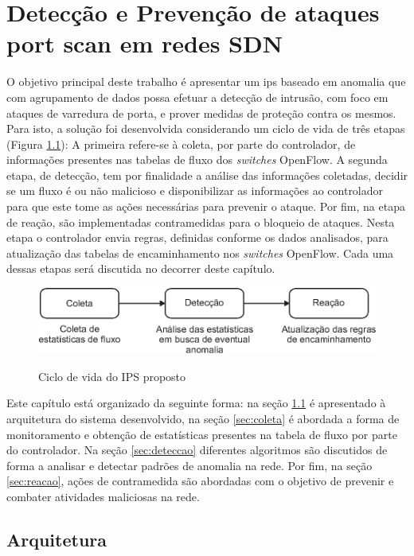 \chapter{Detecção e Prevenção de ataques port scan em redes SDN}
\label{cap:metodologia}

O objetivo principal deste trabalho é apresentar um \gls{ips} baseado em anomalia que com agrupamento de dados possa efetuar a detecção de intrusão, com foco em ataques de varredura de porta, e prover medidas de proteção contra os mesmos. Para isto, a solução foi desenvolvida considerando um ciclo de vida de três etapas (Figura \ref{fig:lifecicle}): A primeira refere-se à coleta, por parte do controlador, de informações presentes nas tabelas de fluxo dos \textit{switches} OpenFlow. A segunda etapa, de detecção, tem por finalidade a análise das informações coletadas, decidir se um fluxo é ou não malicioso e disponibilizar as informações ao controlador para que este tome as ações necessárias para prevenir o ataque. Por fim, na etapa de reação, são implementadas contramedidas para o bloqueio de ataques. Nesta etapa o controlador envia regras, definidas conforme os dados analisados, para atualização das tabelas de encaminhamento nos \textit{switches} OpenFlow. Cada uma dessas etapas será discutida no decorrer deste capítulo.

\begin{figure}[H]
  \centering
  \caption{Ciclo de vida do IPS proposto}
  \includegraphics[width=.650\textwidth]{images/lifecicle.eps}
  \label{fig:lifecicle}
\end{figure}

Este capítulo está organizado da seguinte forma: na seção \ref{sec:arq-prop} é apresentado à arquitetura do sistema desenvolvido, na seção \ref{sec:coleta} é abordada a forma de monitoramento e obtenção de estatísticas presentes na tabela de fluxo por parte do controlador. Na seção \ref{sec:deteccao} diferentes algoritmos são discutidos de forma a analisar e detectar padrões de anomalia na rede. Por fim, na seção \ref{sec:reacao}, ações de contramedida são abordadas com o objetivo de prevenir e combater atividades maliciosas na rede.

\FloatBarrier
\section{Arquitetura}
\label{sec:arq-prop}

